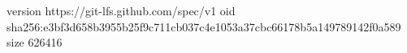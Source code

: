 version https://git-lfs.github.com/spec/v1
oid sha256:e3bf3d658b3955b25f9c711cb037c4e1053a37cbc66178b5a149789142f0a589
size 626416
